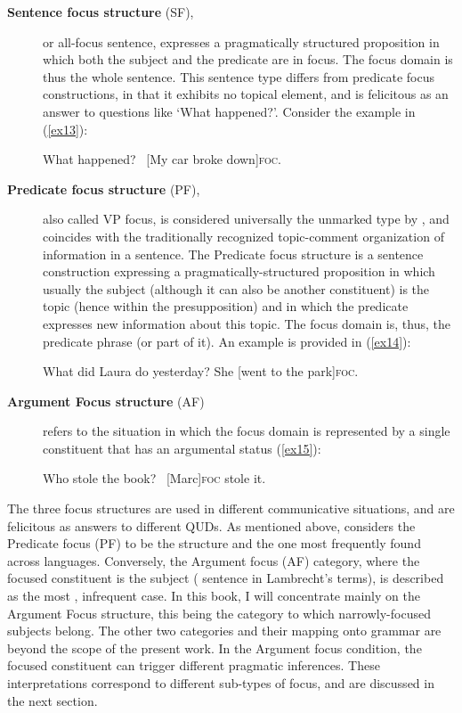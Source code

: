 \begin{description}
  \item[\textbf{Sentence focus structure} (SF),] or all-focus sentence, expresses a pragmatically structured proposition in which both the subject and the predicate are in focus. The focus domain is thus the whole sentence. This sentence type differs from predicate focus constructions, in that it exhibits no topical element, and is felicitous as an answer to questions like ‘What happened?'. Consider the example in (\ref{ex13}):
    
\ea \label{ex13}
\ea What happened?
\ex \ [My car broke down]\textsc{foc}\normalsize. \hfill \parencite[223]{lambrecht1996information}   
\z \z

\item[\textbf{Predicate focus structure} (PF),] also called VP focus, is considered universally the unmarked type by \textcite[622]{lambrecht2000subjects}, and coincides with the traditionally recognized topic-comment organization of information in a sentence. The Predicate focus structure is a sentence construction expressing a pragmatically-structured proposition in which usually the subject (although it can also be another constituent) is the topic (hence within the presupposition) and in which the predicate expresses new information about this topic. The focus domain is, thus, the predicate phrase (or part of it). An example is provided in (\ref{ex14}):
    
    \ea \label{ex14}
    \ea What did Laura do yesterday?
    \ex She [went to the park]\textsc{foc}\normalsize.
    \z \z

\item[\textbf{Argument Focus structure} (AF)] refers to the situation in which the focus domain is represented by a single constituent that has an argumental status (\ref{ex15}):

\ea \label{ex15}
\ea Who stole the book?
\ex \ [Marc]\textsc{foc} \normalsize stole it.
\z \z

\end{description}


The three focus structures are used in different communicative situations, and are felicitous as answers to different QUDs. As mentioned above, \textcite{lambrecht2010constraints} considers the Predicate focus (PF) to be the  structure and the one most frequently found across languages. 
Conversely, the Argument focus (AF) category, where the focused constituent is the subject ( sentence in Lambrecht's terms), is described as the most , infrequent case. 
In this book, I will concentrate mainly on the Argument Focus structure, this being the category to which narrowly-focused subjects belong. The other two categories and their mapping onto grammar are beyond the scope of the present work.
In the Argument focus condition, the focused constituent can trigger different pragmatic inferences. These interpretations correspond to different sub-types of focus, and are discussed in the next section.

